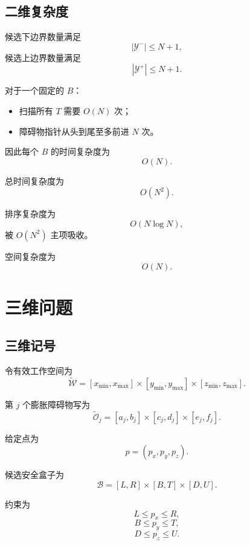 \documentclass[UTF8,12pt,a4paper]{ctexart}
\begin{document}
\subsection{二维复杂度}

候选下边界数量满足
\[
|\mathcal Y^-|\le N+1,
\]
候选上边界数量满足
\[
|\mathcal Y^+|\le N+1.
\]

对于一个固定的 $B$：
\begin{itemize}
    \item 扫描所有 $T$ 需要 $O(N)$ 次；
    \item 障碍物指针从头到尾至多前进 $N$ 次。
\end{itemize}

因此每个 $B$ 的时间复杂度为
\[
O(N).
\]

总时间复杂度为
\begin{equation}
\boxed{
O(N^2).
}
\end{equation}

排序复杂度为
\[
O(N\log N),
\]
被 $O(N^2)$ 主项吸收。

空间复杂度为
\begin{equation}
\boxed{
O(N).
}
\end{equation}

\section{三维问题}

\subsection{三维记号}

令有效工作空间为
\begin{equation}
\widetilde{\mathcal W}
=
[x_{\min},x_{\max}]
\times
[y_{\min},y_{\max}]
\times
[z_{\min},z_{\max}].
\end{equation}

第 $j$ 个膨胀障碍物写为
\begin{equation}
    \widetilde{\mathcal O}_j
    =
    [a_j,b_j]
    \times
    [c_j,d_j]
    \times
    [e_j,f_j].
\end{equation}

给定点为
\[
p=(p_x,p_y,p_z).
\]

候选安全盒子为
\begin{equation}
    \mathcal B
    =
    [L,R]
    \times
    [B,T]
    \times
    [D,U].
\end{equation}

约束为
\begin{equation}
    L\le p_x\le R,
\end{equation}
\begin{equation}
    B\le p_y\le T,
\end{equation}
\begin{equation}
    D\le p_z\le U.
\end{equation}
\end{document}
